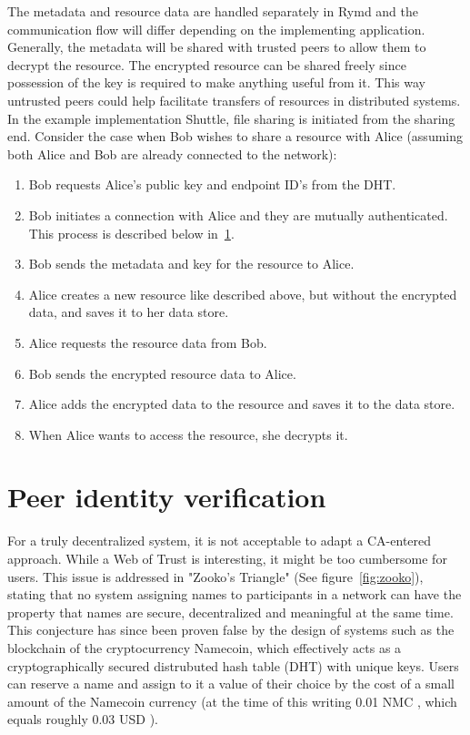 The metadata and resource data are handled separately in Rymd and the communication flow will differ depending on the implementing application. Generally, the metadata will be shared with trusted peers to allow them to decrypt the resource. The encrypted resource can be shared freely since possession of the key is required to make anything useful from it. This way untrusted peers could help facilitate transfers of resources in distributed systems. In the example implementation Shuttle, file sharing is initiated from the sharing end. Consider the case when Bob wishes to share a resource with Alice (assuming both Alice and Bob are already connected to the network):
\begin{enumerate}
  \item Bob requests Alice's public key and endpoint ID's from the DHT.
  \item Bob initiates a connection with Alice and they are mutually authenticated. This process is described below in~\ref{sec:authorization}.
  \item Bob sends the metadata and key for the resource to Alice.
  \item Alice creates a new resource like described above, but without the encrypted data, and saves it to her data store.
  \item Alice requests the resource data from Bob.
  \item Bob sends the encrypted resource data to Alice.
  \item Alice adds the encrypted data to the resource and saves it to the data store.
  \item When Alice wants to access the resource, she decrypts it.
\end{enumerate}


\section{Peer identity verification}
\label{sec:authorization}

For a truly decentralized system, it is not acceptable to adapt a CA-entered approach. While a Web of Trust is interesting, it might be too cumbersome for users. This issue is addressed in "Zooko's Triangle" (See figure~\ref{fig:zooko}), stating that no system assigning names to participants in a network can have the property that names are secure, decentralized and meaningful at the same time. This conjecture has since been proven false by the design of systems such as the blockchain of the cryptocurrency Namecoin, which effectively acts as a cryptographically secured distrubuted hash table (DHT) with unique keys. Users can reserve a name and assign to it a value of their choice by the cost of a small amount of the Namecoin currency (at the time of this writing 0.01 NMC \cite{Namecoin:2014:Online}, which equals roughly 0.03 USD \cite{CryptoCoinCharts:2014:Online}).

